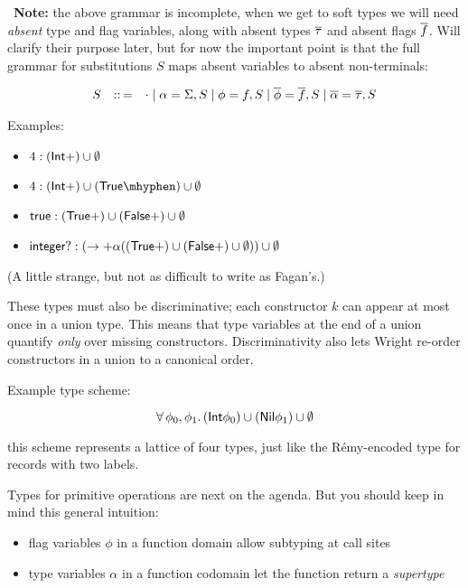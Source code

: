 \documentclass{article}
\begin{document}
\noindent \leafNE~\textbf{Note:} the above grammar is incomplete,
 when we get to soft types we will need \emph{absent} type and flag variables,
  along with absent types $\overline{\tau}$ and absent flags $\overline{f}$.
 Will clarify their purpose later, but for now the important point is that
  the full grammar for substitutions $S$ maps absent variables to absent non-terminals:

 \[\begin{array}{l c l}
    S & ::\,= & \cdot \mid \alpha = \Sigma,S \mid \phi = f, S \mid \overline{\phi} = \overline{f}, S \mid \overline{\alpha} = \overline{\tau}, S
 \end{array}\]

Examples:
\begin{itemize}
\item
  $4 : (\mathsf{Int} +) \cup \emptyset$
\item
  $4 : (\tint +) \cup (\ttrue \mhyphen) \cup \emptyset$
\item
  $\mathsf{true} : (\mathsf{True} +) \cup (\mathsf{False} +) \cup \emptyset$
\item
  $\mathsf{integer?} : (\rightarrow + \alpha ((\mathsf{True} +) \cup (\mathsf{False} +) \cup \emptyset)) \cup \emptyset$
\end{itemize}

(A little strange, but not as difficult to write as Fagan's.)

These types must also be discriminative; each constructor $k$ can appear at most
 once in a union type.
This means that type variables at the end of a union quantify \emph{only} over
 missing constructors.
Discriminativity also lets Wright re-order constructors in a union to a canonical order.

Example type scheme:

$$ \forall\,\phi_0, \phi_1.\,(\mathsf{Int} \phi_0) \cup (\mathsf{Nil} \phi_1) \cup \emptyset $$

this scheme represents a lattice of four types, just like the R\'{e}my-encoded
 type for records with two labels.

Types for primitive operations are next on the agenda.
But you should keep in mind this general intuition:
\begin{itemize}
\item
  flag variables $\phi$ in a function domain allow subtyping at call sites
\item
  type variables $\alpha$ in a function codomain let the function return a \emph{supertype}
\end{itemize}
\end{document}

